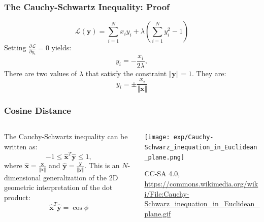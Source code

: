 \documentclass{beamer}
\begin{document}
\begin{frame}
  \frametitle{The Cauchy-Schwartz Inequality: Proof}

  \begin{displaymath}
    {\mathcal L}(\bm{y}) = \sum_{i=1}^N x_iy_i +\lambda\left(\sum_{i=1}^N y_i^2-1\right)
  \end{displaymath}
  Setting $\frac{\partial{\mathcal L}}{\partial y_i}=0$ yields:
  \begin{displaymath}
    y_i = -\frac{x_i}{2\lambda},
  \end{displaymath}
  There are two values of $\lambda$ that satisfy the constraint
  $\Vert\bm{y}\Vert=1$.  They are:
  \begin{displaymath}
    y_i = \pm \frac{x_i}{\Vert\bm{x}\Vert}
  \end{displaymath}
\end{frame}

\begin{frame}
  \frametitle{Cosine Distance}
  \begin{columns}
    \begin{column}{0.5\textwidth}
      The Cauchy-Schwartz inequality can be written as:
      \begin{displaymath}
        -1 \le \hat{\bm{x}}^T\hat{\bm{y}}\le 1,
      \end{displaymath}
      where $\hat{\bm{x}}=\frac{\bm{x}}{\Vert\bm{x}\Vert}$ and
      $\hat{\bm{y}}=\frac{\bm{y}}{\Vert\bm{y}\Vert}$.  This is an
      $N$-dimensional generalization of the 2D geometric
      interpretation of the dot product:
      \begin{displaymath}
        \hat{\bm{x}}^T\hat{\bm{y}} = \cos\phi
      \end{displaymath}
    \end{column}
    \begin{column}{0.5\textwidth}
      \begin{center}
        \texttt{[image: exp/Cauchy-Schwarz\_inequation\_in\_Euclidean\_plane.png]}

        CC-SA 4.0,
        \url{https://commons.wikimedia.org/wiki/File:Cauchy-Schwarz_inequation_in_Euclidean_plane.gif}
      \end{center}
    \end{column}
  \end{columns}
\end{frame}
        
\end{document}
